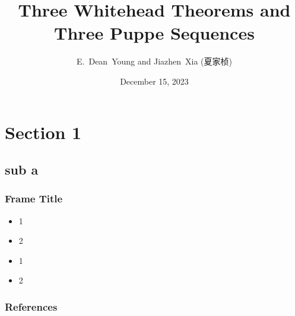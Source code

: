 \documentclass{beamer}
\title{Three Whitehead Theorems and Three Puppe Sequences}
\author{E.~Dean~Young and Jiazhen~Xia (夏家桢)}
\date{December 15, 2023}
\begin{document}
\begin{frame}
\titlepage
\end{frame}


\section{Section 1}
\subsection{sub a}

\begin{frame}
\frametitle{Frame Title}
\begin{itemize}
	\item 1
	\item 2
\end{itemize}
\medskip
\begin{itemize}
	\item 1
	\item 2
\end{itemize}
\end{frame}



\begin{frame}[allowframebreaks]
	\nocite{*}
       \frametitle{References}
\end{frame}


\end{document}

